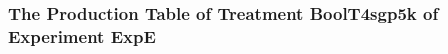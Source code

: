  \begin{frame}
 \fontsize{8pt}{9pt}\selectfont
 \frametitle{ The Production Table of Treatment BoolT4sgp5k of Experiment ExpE }

 \label{ExpEGrammarTable004.tex}  
 \end{frame}

